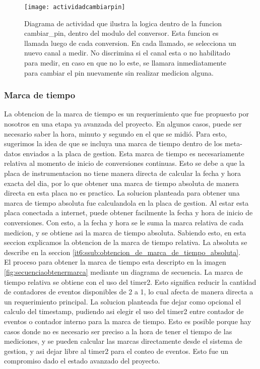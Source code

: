 \begin{figure}[h]
  \centering
  \texttt{[image: actividadcambiarpin]}
  \caption[Diagrama de actividad de la funcion cambiar pin]{Diagrama de actividad que ilustra la logica dentro de la funcion cambiar\_pin, dentro del modulo del conversor. Esta funcion es llamada luego de cada conversion. En cada llamado, se selecciona un nuevo canal a medir. No discrimina si el canal esta o no habilitado para medir, en caso en que no lo este, se llamara inmediatamente para cambiar el pin nuevamente sin realizar medicion alguna.}\label{fig:actividadcambiarpin}
\end{figure}

\subsubsection{Marca de tiempo} %
\label{ssub:marca_de_tiempo}

La obtencion de la marca de tiempo es un requerimiento que fue propuesto por nosotros en una etapa ya avanzada del proyecto. En algunos casos, puede ser necesario saber la hora, minuto y segundo en el que se midió. Para esto, sugerimos la idea de que se incluya una marca de tiempo dentro de los meta-datos enviados a la placa de gestion. Esta marca de tiempo es necesariamente relativa al momento de inicio de conversiones continuas. Esto se debe a que la placa de instrumentacion no tiene manera directa de calcular la fecha y hora exacta del dia, por lo que obtener una marca de tiempo absoluta de manera directa en esta placa no es practico. 
La solucion planteada para obtener una marca de tiempo absoluta fue calculandola en la placa de gestion. Al estar esta placa conectada a internet, puede obtener facilmente la fecha y hora de inicio de conversiones. Con esto, a la fecha y hora se le suma la marca relativa de cada medicion, y se obtiene asi la marca de tiempo absoluta. Sabiendo esto, en esta seccion explicamos la obtencion de la marca de tiempo relativa. La absoluta se describe en la seccion \ref{it6:ssub:obtencion_de_marca_de_tiempo_absoluta}. \\

El proceso para obtener la marca de tiempo esta descripto en la imagen \ref{fig:secuenciaobtenermarca} mediante un diagrama de secuencia. La marca de tiempo relativa se obtiene con el uso del timer2. Esto significa reducir la cantidad de contadores de eventos disponibles de 2 a 1, lo cual afecta de manera directa a un requerimiento principal. La solucion planteada fue dejar como opcional el calculo del timestamp, pudiendo asi elegir el uso del timer2 entre contador de eventos o contador interno para la marca de tiempo. Esto es posible porque hay casos donde no es necesario ser preciso a la hora de tener el tiempo de las mediciones, y se pueden calcular las marcas directamente desde el sistema de gestion, y asi dejar libre al timer2 para el conteo de eventos. Esto fue un compromiso dado el estado avanzado del proyecto.


